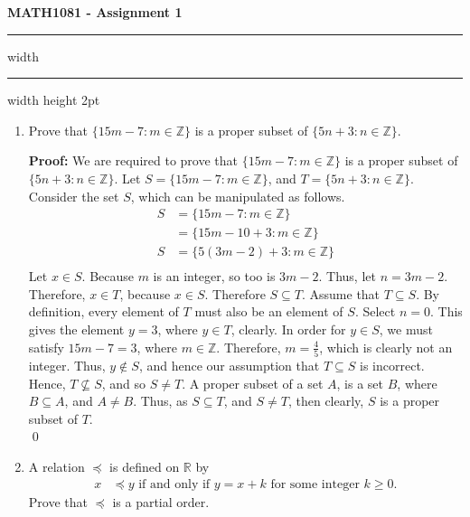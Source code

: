 \documentclass[a4paper,11pt]{article}
\newcommand{\ds}{\displaystyle}
\begin{document}
\begin{center}
	\LARGE \textbf{MATH1081 - Assignment 1}
	\vspace{2mm}
	\hrule width \hsize \kern 1mm \hrule width \hsize height 2pt 
\end{center}


\begin{enumerate}[leftmargin=*]
	\item Prove that $\ds{\{15m-7:m \in \mathbb{Z}\}}$ is a proper subset of $\ds{\{5n+3:n \in \mathbb{Z}\}}$.

		\textbf{Proof:} We are required to prove that $\ds{\{15m-7:m \in \mathbb{Z}\}}$ is a proper subset of $\ds{\{5n+3:n \in \mathbb{Z}\}}$. Let $\ds{S = \{15m-7:m \in \mathbb{Z}\}}$, and $\ds{T = \{5n+3:n \in \mathbb{Z}\}}$. Consider the set $\ds{S}$, which can be manipulated as follows.
		\begin{align*}
			S & = \{15m-7:m \in \mathbb{Z}\} \\
			  & = \{15m-10+3:m \in \mathbb{Z}\} \\
			S & = \{5(3m-2)+3:m \in \mathbb{Z}\} \\
		\end{align*}
		Let $\ds{x \in S}$. Because $\ds{m}$ is an integer, so too is $\ds{3m-2}$. Thus, let $\ds{n = 3m-2}$. Therefore, $\ds{x \in T}$, because $\ds{x \in S}$. Therefore $\ds{S \subseteq T}$.
		\bigbreak
		Assume that $\ds{T \subseteq S}$. By definition, every element of $\ds{T}$ must also be an element of $\ds{S}$. Select $\ds{n = 0}$. This gives the element $\ds{y = 3}$, where $\ds{y \in T}$, clearly. In order for $\ds{y \in S}$, we must satisfy $\ds{15m-7 = 3}$, where $\ds{m\in \mathbb{Z}}$. Therefore, $\ds{m = \frac{4}{5}}$, which is clearly not an integer. Thus, $\ds{y \notin S}$, and hence our assumption that $\ds{T \subseteq S}$ is incorrect. Hence, $\ds{T \nsubseteq S}$, and so $\ds{S \neq T}$.
		\bigbreak
		A proper subset of a set $\ds{A}$, is a set $\ds{B}$, where $\ds{B \subseteq A}$, and $\ds{A \neq B}$. Thus, as $\ds{S \subseteq T}$, and $\ds{S \neq T}$, then clearly, $\ds{S}$ is a proper subset of $\ds{T}$.\\
		\qed

	\item A relation $\ds{\preceq}$ is defined on $\ds{\mathbb{R}}$ by 
		\begin{align*}
			x & \preceq y \text{ if and only if } y=x+k \text{ for some integer } k \geq 0.
		\end{align*}
		Prove that $\ds{\preceq}$ is a partial order.


\end{enumerate}
\end{document}
